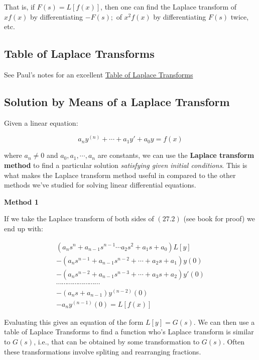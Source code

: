 \documentclass{article}
\begin{document}
That is, if $F(s) = L[f(x)]$, then one can find the Laplace transform of $xf(x)$ by differentiating $-F(s);$ of $x^2 f(x)$ by differentiating $F(s)$ twice, etc.

\subsection{Table of Laplace Transforms}

See Paul's notes for an excellent \href{https://tutorial.math.lamar.edu/classes/de/laplace_table.aspx}{Table of Laplace Transforms}

\subsection{Solution by Means of a Laplace Transform}

Given a linear equation:

\[ \tag{27.2} a_n y^{(n)} + \cdots + a_1 y' + a_0y = f(x) \]

where $ a_n \neq 0$ and $a_0, a_1, \cdots, a_n$ are constants, we can use the \textbf{Laplace transform method} to find a particular solution \emph{satisfying given initial conditions}. This is what makes the Laplace transform method useful in compared to the other methods we've studied for solving linear differential equations.

\textbf{Method 1}

If we take the Laplace transform of both sides of $(27.2)$ (see book for proof) we end up with:

\[ \tag{27.41} \begin{aligned} (a_n s^n + a_{n-1}s^{n-1} \cdots a_2 s^2 + a_1 s + a_0)L[y] \\ - (a_n s^{n-1} + a_{n-1}s^{n-2} + \cdots + a_2 s + a_1)y(0) \\ - (a_n s^{n-2} + a_{n-1}s^{n-3} + \cdots + a_3 s + a_2)y'(0) \\ \cdots \cdots \cdots \cdots \cdots \cdots \cdots \cdots \\ -(a_n s + a_{n-1})y^{(n-2)}(0) \\ - a_n y^{(n-1)}(0)  = L[f(x)]\end{aligned} \]

Evaluating this gives an equation of the form $L[y] = G(s)$. We can then use a table of Laplace Transforms to find a function who's Laplace transform is similar to $G(s)$, i.e., that can be obtained by some transformation to $G(s)$. Often these transformations involve spliting and rearranging fractions.
\end{document}
